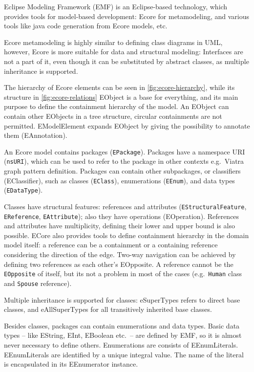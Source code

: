 Eclipse Modeling Framework (EMF) is an Eclipse-based technology, which provides tools for model-based development: 
Ecore \cite{ecore-package} for metamodeling, and various tools like java code generation from Ecore models, etc.

Ecore metamodeling is highly similar to defining class diagrams in UML, however, 
Ecore is more suitable for data and structural modeling: Interfaces are not a part of it, even though it can be substituted by abstract classes, as multiple inheritance is supported.

The hierarchy of Ecore elements can be seen in \autoref{fig:ecore-hierarchy}, while its structure in \autoref{fig:ecore-relations}
EObject is a base for everything, and its main purpose to define the containment hierarchy of the model. 
An EObject can contain other EObjects in a tree structure, circular containments are not permitted.
EModelElement expands EObject by giving the possibility to annotate them (EAnnotation).

An Ecore model contains packages (\texttt{EPackage}). 
Packages have a namespace URI (\texttt{nsURI}), which can be used to refer to the package in other contexts e.g.\ Viatra graph pattern definition.
Packages can contain other subpackages, or classifiers (EClassifier), such as classes (\texttt{EClass}), enumerations (\texttt{EEnum}), and data types (\texttt{EDataType}).

Classes have structural features: references and attributes (\texttt{EStructuralFeature}, \texttt{EReference}, \texttt{EAttribute}); also they have operations (EOperation).
References and attributes have multiplicity, defining their lower and upper bound is also possible.
ECore also provides tools to define containment hierarchy in the domain model itself: a reference can be a containment or a containing reference considering the direction of the edge. 
Two-way navigation can be achieved by defining two references as each other's EOpposite. A reference cannot be the \texttt{EOpposite} of itself, but its not a problem in most of the cases (e.g.\ \texttt{Human} class and \texttt{Spouse} reference). 

Multiple inheritance is supported for classes: eSuperTypes refers to direct base classes, and eAllSuperTypes for all transitively inherited base classes.

Besides classes, packages can contain enumerations and data types. 
Basic data types -- like EString, EInt, EBoolean etc.\ -- are defined by EMF, so it is almost never necessary to define others.
Enumerations are consists of EEnumLiterals. 
EEnumLiterals are identified by a unique integral value.
The name of the literal is encapsulated in its EEnumerator instance.


